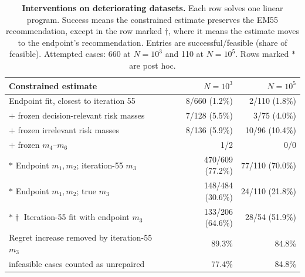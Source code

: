 \begin{table}[t]
\centering
\small
\caption{\textbf{Interventions on deteriorating datasets.}  Each row solves
one linear program.  Success means the constrained estimate preserves the
EM55 recommendation, except in the row marked $\dagger$, where it means the
estimate moves to the endpoint's recommendation.  Entries are
successful/feasible (share of feasible).  Attempted cases: 660 at $N=10^3$
and 110 at $N=10^5$.  Rows marked $*$ are post hoc.}
\begin{tabular}{@{}lrr@{}}
\toprule
Constrained estimate & $N=10^3$ & $N=10^5$ \\
\midrule
Endpoint fit, closest to iteration 55 & 8/660 (1.2\%) & 2/110 (1.8\%) \\
\quad $+$ frozen decision-relevant risk masses & 7/128 (5.5\%) & 3/75 (4.0\%) \\
\quad $+$ frozen irrelevant risk masses & 8/136 (5.9\%) & 10/96 (10.4\%) \\
\quad $+$ frozen $m_4$--$m_6$ & 1/2 & 0/0 \\
$*$ Endpoint $m_1,m_2$; iteration-55 $m_3$ & 470/609 (77.2\%) & 77/110 (70.0\%) \\
$*$ Endpoint $m_1,m_2$; true $m_3$ & 148/484 (30.6\%) & 24/110 (21.8\%) \\
$*\dagger$ Iteration-55 fit with endpoint $m_3$ & 133/206 (64.6\%) & 28/54 (51.9\%) \\
\midrule
Regret increase removed by iteration-55 $m_3$ & 89.3\% & 84.8\% \\
\quad infeasible cases counted as unrepaired & 77.4\% & 84.8\% \\
\bottomrule
\end{tabular}
\end{table}
